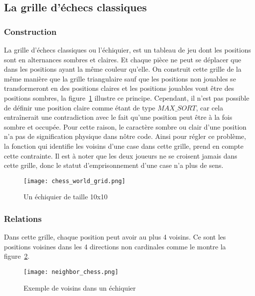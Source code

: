 \documentclass[11pt]{article}
\begin{document}
        \subsection{La grille d'échecs classiques}
            \subsubsection{Construction}
                La grille d'échecs classiques ou l'échiquier, est un tableau de jeu dont les positions sont en alternances sombres et claires. Et chaque pièce ne peut se déplacer que dans les positions ayant la même couleur qu'elle. On construit cette grille de la même manière que la grille triangulaire sauf que les positions non jouables se transformeront en des positions claires et les positions jouables vont être des positions sombres, la figure~\ref{figure30} illustre ce principe. Cependant, il n'est pas possible de définir une position claire comme étant de type $MAX\_SORT$, car cela entraînerait une contradiction avec le fait qu'une position peut être à la fois sombre et occupée. Pour cette raison, le caractère sombre ou clair d'une position n'a pas de signification physique dans nôtre code. Ainsi pour régler ce problème, la fonction qui identifie les voisins d'une case dans cette grille, prend en compte cette contrainte. Il est à noter que les deux joueurs ne se croisent jamais dans cette grille, donc le statut d'emprisonnement d'une case n'a plus de sens.
                  \begin{figure}[h]
                            \centering
                            \texttt{[image: chess\_world\_grid.png]}
                            \caption{ Un échiquier de taille 10x10 }
                            \label{figure30}
                            \end{figure}
                
            \subsubsection{Relations}
                Dans cette grille, chaque position peut avoir au plus 4 voisins. Ce sont les positions voisines dans les 4 directions non cardinales comme le montre la figure~\ref{figure31}.
                \begin{figure}[h]
                                \centering
                                \texttt{[image: neighbor\_chess.png]}
                                \caption{ Exemple de voisins dans un échiquier}
                                \label{figure31}
                                \end{figure}
\end{document}
